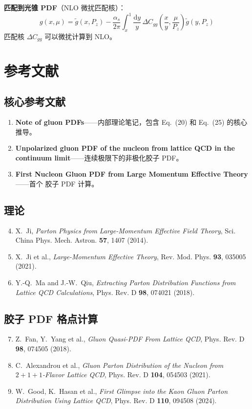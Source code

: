 \documentclass[11pt,a4paper]{ctexart}
\newcommand{\LaMET}{\text{LaMET}}
\begin{document}
\textbf{匹配到光锥 PDF}（NLO 微扰匹配核）：
\begin{equation}\label{eq:matching}
\boxed{g(x, \mu) = \tilde{g}(x, P_z) - \frac{\alpha_s}{2\pi}
\int_{x}^{1} \frac{\mathrm{d}y}{y} \,
\Delta C_{gg}\!\left(\frac{x}{y}, \frac{\mu}{P_z}\right)
\tilde{g}(y, P_z)}
\end{equation}
匹配核 $\Delta C_{gg}$ 可以微扰计算到 NLO。

\section{参考文献}

\subsection*{核心参考文献}
\begin{enumerate}
  \item \textbf{Note of gluon PDFs}——内部理论笔记，包含 Eq.~(20) 和 Eq.~(25) 的核心推导。
  \item \textbf{Unpolarized gluon PDF of the nucleon from lattice QCD in the continuum limit}——连续极限下的非极化胶子 PDF。
  \item \textbf{First Nucleon Gluon PDF from Large Momentum Effective Theory}——首个 \LaMET{}胶子 PDF 计算。
\end{enumerate}

\subsection*{\LaMET{}理论}
\begin{enumerate}\setcounter{enumi}{3}
  \item X.~Ji, \textit{Parton Physics from Large-Momentum Effective Field Theory}, Sci. China Phys. Mech. Astron. \textbf{57}, 1407 (2014).
  \item X.~Ji et al., \textit{Large-Momentum Effective Theory}, Rev. Mod. Phys. \textbf{93}, 035005 (2021).
  \item Y.-Q.~Ma and J.-W.~Qiu, \textit{Extracting Parton Distribution Functions from Lattice QCD Calculations}, Phys. Rev. D \textbf{98}, 074021 (2018).
\end{enumerate}

\subsection*{胶子 PDF 格点计算}
\begin{enumerate}\setcounter{enumi}{6}
  \item Z.~Fan, Y.~Yang et al., \textit{Gluon Quasi-PDF From Lattice QCD}, Phys. Rev. D \textbf{98}, 074505 (2018).
  \item C.~Alexandrou et al., \textit{Gluon Parton Distribution of the Nucleon from $2+1+1$-Flavor Lattice QCD}, Phys. Rev. D \textbf{104}, 054503 (2021).
  \item W.~Good, K.~Hasan et al., \textit{First Glimpse into the Kaon Gluon Parton Distribution Using Lattice QCD}, Phys. Rev. D \textbf{110}, 094508 (2024).
\end{enumerate}
\end{document}
